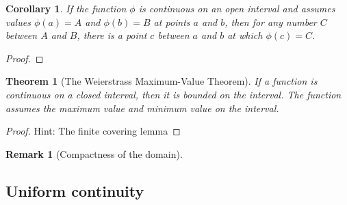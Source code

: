 \documentclass[onecolumn]{ctexart}
\newtheorem{theorem}{Theorem}
\newtheorem{corollary}{Corollary}
\newtheorem{remark}{Remark}
\begin{document}
\begin{corollary}
  If the function $\phi$ is continuous on an open interval and assumes values 
  $\phi(a) = A$ and $\phi(b) = B$ at points $a$ and $b$, then for any number $C$ 
  between $A$ and $B$, there is a point $c$ between $a$ and $b$ at which 
  $\phi(c) = C$.
\end{corollary}
\begin{proof}
  
\end{proof}

\begin{theorem}[The Weierstrass Maximum-Value Theorem]
  If a function is continuous on a closed interval, then it is bounded on the 
  interval. The function assumes the maximum value and minimum value on the 
  interval.
\end{theorem}
\begin{proof}
  Hint: The finite covering lemma
\end{proof}
\begin{remark}[Compactness of the domain]
  
\end{remark}

\subsection{Uniform continuity}
\end{document}
